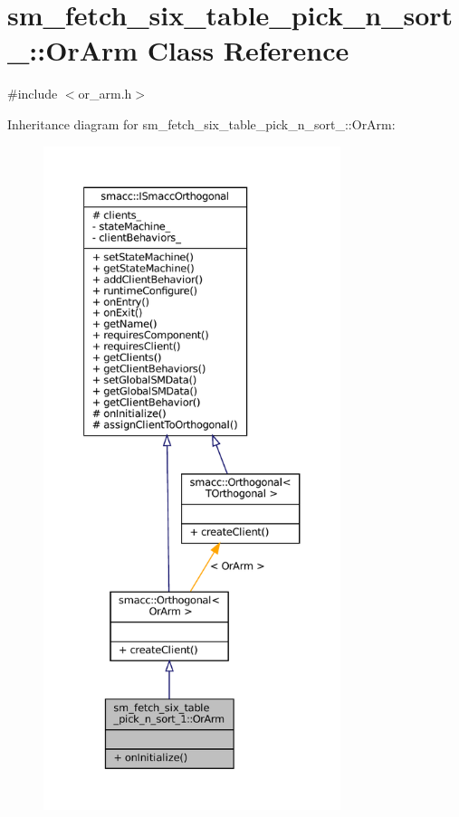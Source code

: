\hypertarget{classsm__fetch__six__table__pick__n__sort__1_1_1OrArm}{}\section{sm\+\_\+fetch\+\_\+six\+\_\+table\+\_\+pick\+\_\+n\+\_\+sort\+\_\+:\+:Or\+Arm Class Reference}
\label{classsm__fetch__six__table__pick__n__sort__1_1_1OrArm}


{\ttfamily \#include $<$or\+\_\+arm.\+h$>$}



Inheritance diagram for sm\+\_\+fetch\+\_\+six\+\_\+table\+\_\+pick\+\_\+n\+\_\+sort\+\_\+:\+:Or\+Arm\+:
\nopagebreak
\begin{figure}[H]
\begin{center}
\leavevmode
\includegraphics[height=550pt]{classsm__fetch__six__table__pick__n__sort__1_1_1OrArm__inherit__graph}
\end{center}
\end{figure}


